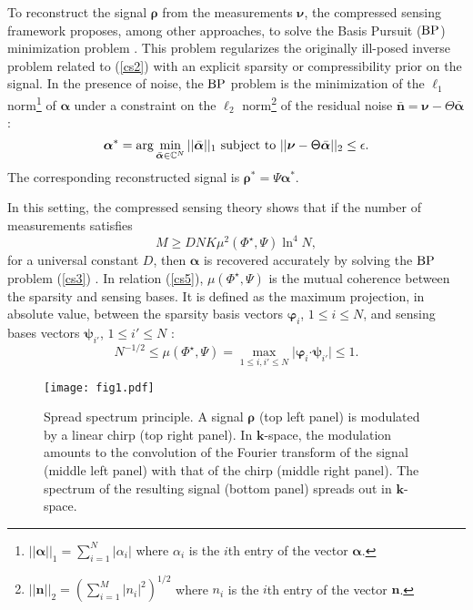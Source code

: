 \documentclass[10pt,draftcls, onecolumn]{IEEEtran}
\begin{document}
To reconstruct the signal $\bm{\rho}$ from the measurements $\bm{\nu}$, the compressed sensing framework proposes, among other approaches, to solve the Basis Pursuit (${\rm BP}$) minimization problem \cite{candes06a, candes06b, candes06c, donoho06, candes07, baraniuk07a, donoho09, rauhut10}. This problem regularizes the originally ill-posed inverse problem related to (\ref{cs2}) with an explicit sparsity or compressibility prior on the signal. In the presence of noise, the ${\rm BP}$ problem is the minimization of the $\ell_{1}$ norm\footnote{$\vert\vert \bm{\alpha} \vert\vert_{1}=\sum_{i=1}^{N}\vert \alpha_{i}\vert$ where $\alpha_{i}$ is the $i$th entry of the vector $\bm{\alpha}$.} of $\bm{\alpha}$ under a constraint on the $\ell_{2}$ norm\footnote{$\vert\vert \bm{n} \vert\vert_{2}=(\sum_{i=1}^{M}\vert n_{i}\vert^{2})^{1/2}$ where $n_{i}$ is the $i$th entry of the vector $\bm{n}$.} of the residual noise $\bar{\bm{n}}= \bm{\nu}-\mathsf{\Theta}\bar{\bm{\alpha}}$:
\begin{equation}
\label{cs3}
\bm{\alpha}^* = \arg \min_{\bar{\bm{\alpha}}\in\mathbb{C}^{N}}\vert\vert\bar{\bm{\alpha}}\vert\vert_{1}\textnormal{ subject to }\vert\vert \bm{\nu}-\mathsf{\Theta}\bar{\bm{\alpha}}\vert\vert_{2}\leq\epsilon.
\end{equation}
The corresponding reconstructed signal is $\bm{\rho}^* = \mathsf{\Psi}\bm{\alpha}^*$. 

In this setting, the compressed sensing theory shows that if the number of measurements satisfies
\begin{equation}
\label{cs5}
M \geq DNK\mu^{2}\left(\mathsf{\Phi}^{\star},\mathsf{\Psi}\right)\ln^{4}N,
\end{equation}
for a universal constant $D$, then $\bm{\alpha}$ is recovered accurately by solving the $\rm BP$ problem (\ref{cs3}) \cite{rauhut10}. In relation (\ref{cs5}), $\mu\left(\mathsf{\Phi}^{\star},\mathsf{\Psi}\right)$ is the mutual coherence between the sparsity and sensing bases. It is defined as the maximum projection, in absolute value, between the sparsity basis vectors $\bm{\varphi}_{i}$, $1 \leq i \leq N$, and sensing bases vectors  $\bm{\psi}_{i'}$, $1 \leq i' \leq N$ \cite{candes07, rauhut10}:
\begin{equation}
\label{cs6}
N^{-1/2} \leq \mu\left(\mathsf{\Phi}^{\star},\mathsf{\Psi}\right) =  \max_{1\leq i,i'\leq N}\vert \bm{\varphi}_{i} \bm{\cdot} \bm{\psi}_{i'} \vert \leq 1.
\end{equation}


\begin{figure}
\centering
\texttt{[image: fig1.pdf]}
\caption{\label{fig:ssp principle} Spread spectrum principle. A signal $\bm{\rho}$ (top left panel) is modulated by a linear chirp (top right panel). In $\bm{k}$-space, the modulation amounts to the convolution of the Fourier transform of the signal (middle left panel) with that of the chirp (middle right panel). The spectrum of the resulting signal (bottom panel) spreads out in $\bm{k}$-space.}
\vspace{-1mm}
\end{figure}
\end{document}
